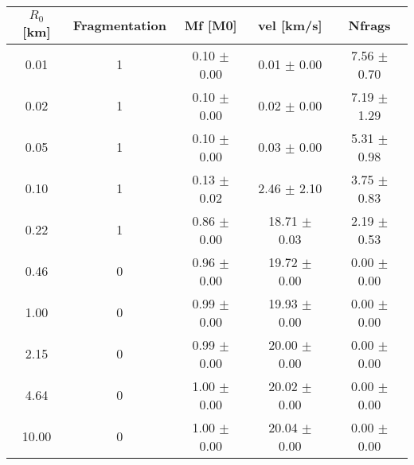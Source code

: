 \begin{tabular}{|c||c||c||c||c|}
\toprule
$R_0$ [km] & Fragmentation & Mf [M0] & vel [km/s] & Nfrags \\
\midrule
0.01 & 1 & 0.10 $\pm$ 0.00 & 0.01 $\pm$ 0.00 & 7.56 $\pm$ 0.70 \\
0.02 & 1 & 0.10 $\pm$ 0.00 & 0.02 $\pm$ 0.00 & 7.19 $\pm$ 1.29 \\
0.05 & 1 & 0.10 $\pm$ 0.00 & 0.03 $\pm$ 0.00 & 5.31 $\pm$ 0.98 \\
0.10 & 1 & 0.13 $\pm$ 0.02 & 2.46 $\pm$ 2.10 & 3.75 $\pm$ 0.83 \\
0.22 & 1 & 0.86 $\pm$ 0.00 & 18.71 $\pm$ 0.03 & 2.19 $\pm$ 0.53 \\
0.46 & 0 & 0.96 $\pm$ 0.00 & 19.72 $\pm$ 0.00 & 0.00 $\pm$ 0.00 \\
1.00 & 0 & 0.99 $\pm$ 0.00 & 19.93 $\pm$ 0.00 & 0.00 $\pm$ 0.00 \\
2.15 & 0 & 0.99 $\pm$ 0.00 & 20.00 $\pm$ 0.00 & 0.00 $\pm$ 0.00 \\
4.64 & 0 & 1.00 $\pm$ 0.00 & 20.02 $\pm$ 0.00 & 0.00 $\pm$ 0.00 \\
10.00 & 0 & 1.00 $\pm$ 0.00 & 20.04 $\pm$ 0.00 & 0.00 $\pm$ 0.00 \\
\bottomrule
\end{tabular}
